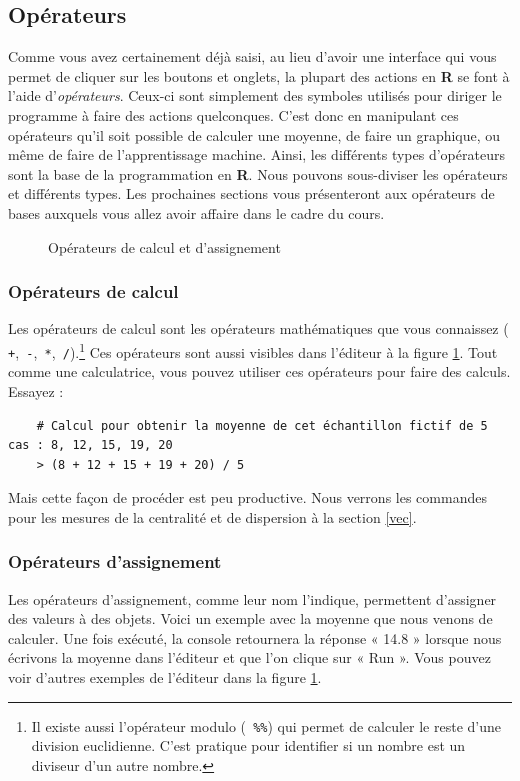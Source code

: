 \documentclass[10.5pt,a4paper]{article}
\newcommand{\rcode}[1]{\texttt{\color{rstudio} #1}}
\begin{document}
  \subsection{Opérateurs}
 Comme vous avez certainement déjà saisi, au lieu d'avoir une interface qui vous permet de cliquer sur les boutons et onglets, la plupart des actions en \textbf{R} se font à l'aide d'\emph{opérateurs}. Ceux-ci sont simplement des symboles utilisés pour diriger le programme à faire des actions quelconques. C'est donc en manipulant ces opérateurs qu'il soit possible de calculer une moyenne, de faire un graphique, ou même de faire de l'apprentissage machine. Ainsi, les différents types d'opérateurs sont la base de la programmation en \textbf{R}. Nous pouvons sous-diviser les opérateurs et différents types. Les prochaines sections vous présenteront aux opérateurs de bases auxquels vous allez avoir affaire dans le cadre du cours. 
 
 \begin{figure}[H]
    \centering
    \caption{Opérateurs de calcul et d'assignement}
    \label{opeAssign}
    \end{figure}
  
    \subsubsection{Opérateurs de calcul}
    Les opérateurs de calcul sont les opérateurs mathématiques que vous connaissez (\rcode{+},\rcode{-},\rcode{*},\rcode{/}).\footnote{Il existe aussi l'opérateur modulo (\rcode{\%\%}) qui permet de calculer le reste d'une division euclidienne. C'est pratique pour identifier si un nombre est un diviseur d'un autre nombre.} Ces opérateurs sont aussi visibles dans l'éditeur à la figure \ref{opeAssign}. Tout comme une calculatrice, vous pouvez utiliser ces opérateurs pour faire des calculs. Essayez :
    
  \begin{lstlisting}
    # Calcul pour obtenir la moyenne de cet échantillon fictif de 5 cas : 8, 12, 15, 19, 20
    > (8 + 12 + 15 + 19 + 20) / 5
  \end{lstlisting}

Mais cette façon de procéder est peu productive. Nous verrons les commandes pour les mesures de la centralité et de dispersion à la section \ref{vec}.

    \subsubsection{Opérateurs d'assignement}
    Les opérateurs d'assignement, comme leur nom l'indique, permettent d'assigner des valeurs à des objets. Voici un exemple avec la moyenne que nous venons de calculer. Une fois exécuté, la console retournera la réponse « 14.8 » lorsque nous écrivons la moyenne dans l'éditeur et que l'on clique sur « Run ». Vous pouvez voir d'autres exemples de l'éditeur dans la figure \ref{opeAssign}.
    
\end{document}
